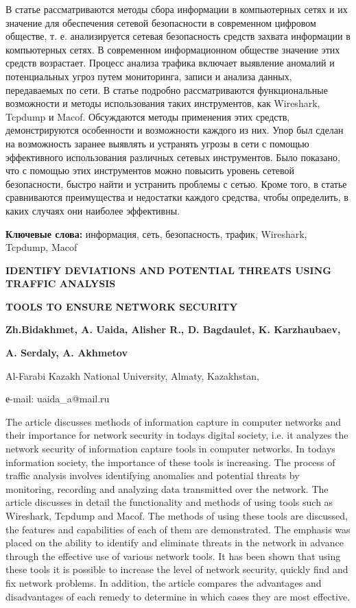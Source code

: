 В статье рассматриваются методы сбора информации в компьютерных сетях и
их значение для обеспечения сетевой безопасности в современном цифровом
обществе, т. е. анализируется сетевая безопасность средств захвата
информации в компьютерных сетях. В современном информационном обществе
значение этих средств возрастает. Процесс анализа трафика включает
выявление аномалий и потенциальных угроз путем мониторинга, записи и
анализа данных, передаваемых по сети. В статье подробно рассматриваются
функциональные возможности и методы использования таких инструментов,
как Wireshark, Tcpdump и Macof. Обсуждаются методы применения этих
средств, демонстрируются особенности и возможности каждого из них. Упор
был сделан на возможность заранее выявлять и устранять угрозы в сети с
помощью эффективного использования различных сетевых инструментов. Было
показано, что с помощью этих инструментов можно повысить уровень сетевой
безопасности, быстро найти и устранить проблемы с сетью. Кроме того, в
статье сравниваются преимущества и недостатки каждого средства, чтобы
определить, в каких случаях они наиболее эффективны.

\textbf{Ключевые слова:} информация, сеть, безопасность, трафик,
Wireshark, Tcpdump, Macof

\textbf{IDENTIFY DEVIATIONS AND POTENTIAL THREATS USING TRAFFIC
ANALYSIS}

\textbf{TOOLS TO ENSURE NETWORK SECURITY}

\textbf{Zh.Bidakhmet, A. Uaida, Alisher R., D. Bagdaulet, K.
Karzhaubaev,}

\textbf{A. Serdaly, A. Akhmetov}

Al-Farabi Kazakh National University, Almaty, Kazakhstan,

е-mail: uaida\_a@mail.ru

The article discusses methods of information capture in computer
networks and their importance for network security in
today\textquotesingle s digital society, i.e. it analyzes the network
security of information capture tools in computer networks. In
today\textquotesingle s information society, the importance of these
tools is increasing. The process of traffic analysis involves
identifying anomalies and potential threats by monitoring, recording and
analyzing data transmitted over the network. The article discusses in
detail the functionality and methods of using tools such as Wireshark,
Tcpdump and Macof. The methods of using these tools are discussed, the
features and capabilities of each of them are demonstrated. The emphasis
was placed on the ability to identify and eliminate threats in the
network in advance through the effective use of various network tools.
It has been shown that using these tools it is possible to increase the
level of network security, quickly find and fix network problems. In
addition, the article compares the advantages and disadvantages of each
remedy to determine in which cases they are most effective.

